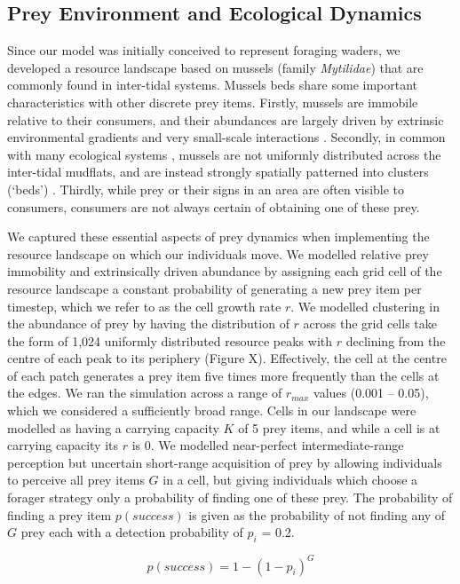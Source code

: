 \documentclass[11pt]{article}
\begin{document}
\subsection{Prey Environment and Ecological Dynamics}

Since our model was initially conceived to represent foraging waders, we developed a resource landscape based on mussels (family \textit{Mytilidae}) that are commonly found in inter-tidal systems.
Mussels beds share some important characteristics with other discrete prey items.
Firstly, mussels are immobile relative to their consumers, and their abundances are largely driven by extrinsic environmental gradients and very small-scale interactions \citep{dejager2020, dejager2011}.
Secondly, in common with many ecological systems \citep{levin1992}, mussels are not uniformly distributed across the inter-tidal mudflats, and are instead strongly spatially patterned into clusters (`beds') \citep{dejager2020, dejager2011}.
Thirdly, while prey or their signs in an area are often visible to consumers, consumers are not always certain of obtaining one of these prey.

We captured these essential aspects of prey dynamics when implementing the resource landscape on which our individuals move.
We modelled relative prey immobility and extrinsically driven abundance by assigning each grid cell of the resource landscape a constant probability of generating a new prey item per timestep, which we refer to as the cell growth rate $r$.
We modelled clustering in the abundance of prey by having the distribution of $r$ across the grid cells take the form of 1,024 uniformly distributed resource peaks with $r$ declining from the centre of each peak to its periphery (Figure X).
Effectively, the cell at the centre of each patch generates a prey item five times more frequently than the cells at the edges.
We ran the simulation across a range of $r_{max}$ values (0.001 -- 0.05), which we considered a sufficiently broad range.
Cells in our landscape were modelled as having a carrying capacity $K$ of 5 prey items, and while a cell is at carrying capacity its $r$ is 0.
We modelled near-perfect intermediate-range perception but uncertain short-range acquisition of prey by allowing individuals to perceive all prey items $G$ in a cell, but giving individuals which choose a forager strategy only a probability of finding one of these prey.
The probability of finding a prey item $p(success)$ is given as the probability of not finding any of $G$ prey each with a detection probability of $p_i$ = 0.2.
\begin{linenomath*}
    \begin{equation}
        p({success}) = 1 - \left(1 - p_i\right) ^ G
    \end{equation}
\end{linenomath*}
\end{document}
